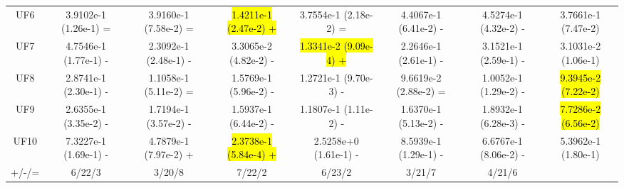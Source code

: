\documentclass[journal]{IEEEtran}
\begin{document}
\begin{table}[tbp]
{\begin{tabular}{cccccccc}
            UF6     & 3.9102e-1 (1.26e-1) =      & 3.9160e-1 (7.58e-2) =      & \hl{1.4211e-1 (2.47e-2) +} & 3.7554e-1 (2.18e-2) =      & 4.4067e-1 (6.41e-2) -      & 4.5274e-1 (4.32e-2) -      & 3.7661e-1 (7.47e-2)      \\
            UF7     & 4.7546e-1 (1.77e-1) -      & 2.3092e-1 (2.48e-1) -      & 3.3065e-2 (4.82e-2) -      & \hl{1.3341e-2 (9.09e-4) +} & 2.2646e-1 (2.61e-1) -      & 3.1521e-1 (2.59e-1) -      & 3.1031e-2 (1.06e-1)      \\
            UF8     & 2.8741e-1 (2.30e-1) -      & 1.1058e-1 (5.11e-2) =      & 1.5769e-1 (5.96e-2) -      & 1.2721e-1 (9.70e-3) -      & 9.6619e-2 (2.88e-2) =      & 1.0052e-1 (1.29e-2) -      & \hl{9.3945e-2 (7.22e-2)} \\
            UF9     & 2.6355e-1 (3.35e-2) -      & 1.7194e-1 (3.57e-2) -      & 1.5937e-1 (6.44e-2) -      & 1.1807e-1 (1.11e-2) -      & 1.6370e-1 (5.13e-2) -      & 1.8932e-1 (6.28e-3) -      & \hl{7.7286e-2 (6.56e-2)} \\
            UF10    & 7.3227e-1 (1.69e-1) -      & 4.7879e-1 (7.97e-2) +      & \hl{2.3738e-1 (5.84e-4) +} & 2.5258e+0 (1.61e-1) -      & 8.5939e-1 (1.29e-1) -      & 6.6767e-1 (8.06e-2) -      & 5.3962e-1 (1.80e-1)      \\
            \hline
            +/-/=   & 6/22/3                     & 3/20/8                     & 7/22/2                     & 6/23/2                     & 3/21/7                     & 4/21/6                     &                          \\
            \bottomrule
        \end{tabular}
    }
    \label{tab:igd_all}
\end{table}
\end{document}
